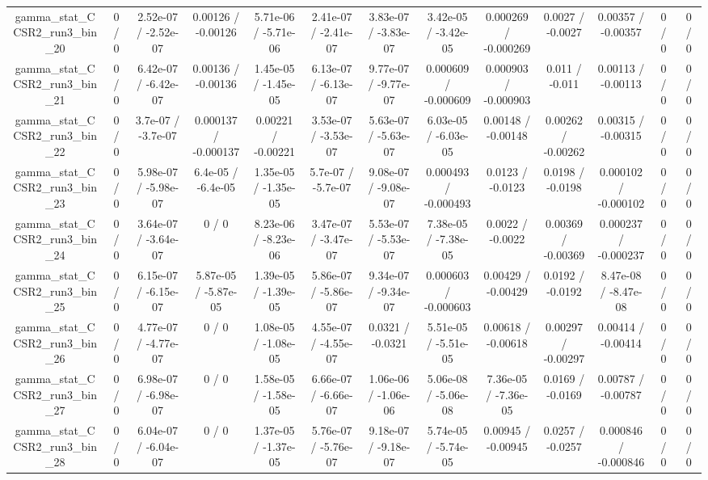 \documentclass[10pt]{article}
\begin{document}
\begin{table}[htbp]
\begin{center}
\begin{tabular}{|c|c|c|c|c|c|c|c|c|c|c|c|c|}
  gamma_stat_CCSR2_run3_bin_20 & 0 / 0 & 2.52e-07 / -2.52e-07 & 0.00126 / -0.00126 & 5.71e-06 / -5.71e-06 & 2.41e-07 / -2.41e-07 & 3.83e-07 / -3.83e-07 & 3.42e-05 / -3.42e-05 & 0.000269 / -0.000269 & 0.0027 / -0.0027 & 0.00357 / -0.00357 & 0 / 0 & 0 / 0 \\ 
  gamma_stat_CCSR2_run3_bin_21 & 0 / 0 & 6.42e-07 / -6.42e-07 & 0.00136 / -0.00136 & 1.45e-05 / -1.45e-05 & 6.13e-07 / -6.13e-07 & 9.77e-07 / -9.77e-07 & 0.000609 / -0.000609 & 0.000903 / -0.000903 & 0.011 / -0.011 & 0.00113 / -0.00113 & 0 / 0 & 0 / 0 \\ 
  gamma_stat_CCSR2_run3_bin_22 & 0 / 0 & 3.7e-07 / -3.7e-07 & 0.000137 / -0.000137 & 0.00221 / -0.00221 & 3.53e-07 / -3.53e-07 & 5.63e-07 / -5.63e-07 & 6.03e-05 / -6.03e-05 & 0.00148 / -0.00148 & 0.00262 / -0.00262 & 0.00315 / -0.00315 & 0 / 0 & 0 / 0 \\ 
  gamma_stat_CCSR2_run3_bin_23 & 0 / 0 & 5.98e-07 / -5.98e-07 & 6.4e-05 / -6.4e-05 & 1.35e-05 / -1.35e-05 & 5.7e-07 / -5.7e-07 & 9.08e-07 / -9.08e-07 & 0.000493 / -0.000493 & 0.0123 / -0.0123 & 0.0198 / -0.0198 & 0.000102 / -0.000102 & 0 / 0 & 0 / 0 \\ 
  gamma_stat_CCSR2_run3_bin_24 & 0 / 0 & 3.64e-07 / -3.64e-07 & 0 / 0 & 8.23e-06 / -8.23e-06 & 3.47e-07 / -3.47e-07 & 5.53e-07 / -5.53e-07 & 7.38e-05 / -7.38e-05 & 0.0022 / -0.0022 & 0.00369 / -0.00369 & 0.000237 / -0.000237 & 0 / 0 & 0 / 0 \\ 
  gamma_stat_CCSR2_run3_bin_25 & 0 / 0 & 6.15e-07 / -6.15e-07 & 5.87e-05 / -5.87e-05 & 1.39e-05 / -1.39e-05 & 5.86e-07 / -5.86e-07 & 9.34e-07 / -9.34e-07 & 0.000603 / -0.000603 & 0.00429 / -0.00429 & 0.0192 / -0.0192 & 8.47e-08 / -8.47e-08 & 0 / 0 & 0 / 0 \\ 
  gamma_stat_CCSR2_run3_bin_26 & 0 / 0 & 4.77e-07 / -4.77e-07 & 0 / 0 & 1.08e-05 / -1.08e-05 & 4.55e-07 / -4.55e-07 & 0.0321 / -0.0321 & 5.51e-05 / -5.51e-05 & 0.00618 / -0.00618 & 0.00297 / -0.00297 & 0.00414 / -0.00414 & 0 / 0 & 0 / 0 \\ 
  gamma_stat_CCSR2_run3_bin_27 & 0 / 0 & 6.98e-07 / -6.98e-07 & 0 / 0 & 1.58e-05 / -1.58e-05 & 6.66e-07 / -6.66e-07 & 1.06e-06 / -1.06e-06 & 5.06e-08 / -5.06e-08 & 7.36e-05 / -7.36e-05 & 0.0169 / -0.0169 & 0.00787 / -0.00787 & 0 / 0 & 0 / 0 \\ 
  gamma_stat_CCSR2_run3_bin_28 & 0 / 0 & 6.04e-07 / -6.04e-07 & 0 / 0 & 1.37e-05 / -1.37e-05 & 5.76e-07 / -5.76e-07 & 9.18e-07 / -9.18e-07 & 5.74e-05 / -5.74e-05 & 0.00945 / -0.00945 & 0.0257 / -0.0257 & 0.000846 / -0.000846 & 0 / 0 & 0 / 0 \\ 

\end{tabular}
\end{center}
\end{table}
\end{document}
